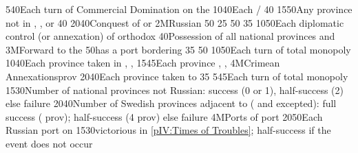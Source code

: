{5}{40}{Each turn of Commercial Domination on the }%
%
%
{10}{40}{Each \COL/\TP}%
%
%
{}{40}{}%
%
 {15}{50}{Any province
  not in \regionNorvege, \regionDanemark, \regionFinlande or \regionSuede}%
%
%
{}{40}{}%
%
 
%
%
{20}{40}{Conquest of \payspskov or \paysryazan}%
%
\EUobjective2M{Russian \provinceSmolenska}{}%
{}{50}{}%
%
%
{}{25}{}%
%
%
{}{50}{}%
%
%
{}{35}{}%
%
%
%
{10}{50}{Each diplomatic control (or annexation) of orthodox \MIN}%
%
%
{}{40}{Possession of all national provinces and \provinceSmolenska}%
%
\EUobjective3M{Forward to the \regionBaltique}{}%
{}{50}{\paysmajeurRussie has a port bordering \regionBaltique}%
%
%
{}{35}{}%
%
%
{}{50}{}%
%
%
%
{10}{50}{Each turn of total  monopoly}%
%
%
%
{10}{40}{Each province taken in \paysmajeurPologne, \paysmajeurLithuanie,
  \paysukraine}%
%
%
{15}{45}{Each province \provinceNeva, \provinceLivonija, \provinceEstland}%
%
\EUobjective4M{Crimean Annexations}{prov}%
{20}{40}{Each province taken to \payscrimee}%
%
%
{}{35}{}%
%
%
%
{5}{45}{Each turn of total  monopoly}%
%
%
{15}{30}{Number of national provinces not Russian: success (0 or 1),
  half-success (2) else failure}%
%
%
{20}{40}{Number of Swedish provinces adjacent to \regionBaltique (\regionSuede
  and \regionFinlande excepted): full success ( prov);
  half-success (4 prov) else failure}%
%
%
\EUobjective4M{Ports of }{port}%
{20}{50}{Each Russian port on }%
%
%
{15}{30}{\RUS victorious in \ref{pIV:Times of Troubles}; half-success if the
  event does not occur}%
